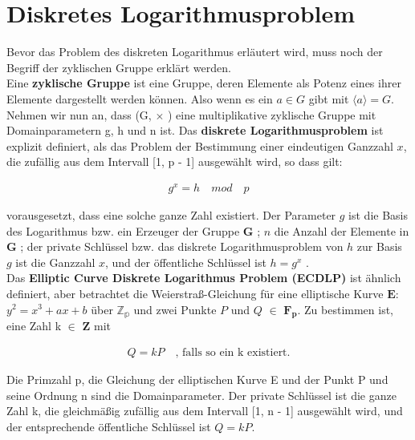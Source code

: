 \section{Diskretes Logarithmusproblem }

Bevor das Problem des diskreten Logarithmus erläutert wird, muss noch der Begriff der zyklischen Gruppe erklärt werden.\\ 

Eine \textbf{zyklische Gruppe} ist eine Gruppe, deren Elemente
als Potenz eines ihrer Elemente dargestellt werden können. Also wenn es ein \(a \in \textit{G}\) gibt mit \(\langle a \rangle = G\).\\ 

Nehmen wir nun an, dass (G, $ \times $ ) eine multiplikative zyklische Gruppe mit Domainparametern g, h und n ist.   
Das \textbf{diskrete Logarithmusproblem} ist explizit definiert, als das Problem der Bestimmung einer eindeutigen Ganzzahl $ x $, die zufällig aus dem Intervall [1, p - 1] ausgewählt wird, so dass gilt:
\begin{ceqn}

\begin{align*}
                g^x = h \quad mod \quad p
\end{align*}

\end{ceqn}
vorausgesetzt, dass eine solche ganze Zahl existiert.
Der Parameter $ g $ ist die Basis des Logarithmus bzw. ein Erzeuger der Gruppe $ \mathbf{G} $ ; $ n $ die Anzahl der Elemente in $ \mathbf{G} $ ; der private Schlüssel bzw. das diskrete Logarithmusproblem von $ h $ zur Basis $ g $  ist die Ganzzahl $ x $, und der öffentliche Schlüssel ist   $ h = g^x $ \cite{Hankerson}. \\


Das \textbf{Elliptic Curve Diskrete Logarithmus Problem (ECDLP)} ist ähnlich definiert, aber betrachtet die Weierstraß-Gleichung für eine elliptische Kurve $ \mathbf{E:} $ $ y^2 = x^3 + ax + b $ über $ \mathbb{Z_p} $ und zwei Punkte $ P $ und $ Q $ $\in $ $ \mathbf{F_p} $.  Zu bestimmen ist, eine Zahl k $ \in $ $ \mathbf{Z} $ mit

\begin{ceqn}
\begin{align*}
      Q = kP  \quad \text{, falls so ein k existiert.}
\end{align*}
   
\end{ceqn}

Die Primzahl p, die Gleichung der elliptischen Kurve E und der Punkt P und seine Ordnung n sind die Domainparameter. Der private Schlüssel ist die ganze Zahl k, die gleichmäßig zufällig aus dem Intervall [1, n - 1] ausgewählt wird, und der entsprechende öffentliche Schlüssel ist $ Q = kP $.

